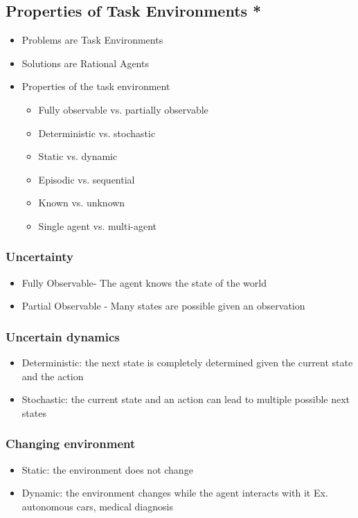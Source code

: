 \documentclass{article}
\begin{document}
\subsection{Properties of Task Environments  *}
\begin{itemize}
\item Problems are Task Environments
\item Solutions are Rational Agents
\item Properties of the task environment 
\begin{itemize}
\item Fully observable vs. partially observable
\item Deterministic vs. stochastic
\item Static vs. dynamic
\item Episodic vs. sequential
\item Known vs. unknown
\item Single agent vs. multi-agent
\end{itemize}
\end{itemize}

\subsubsection{Uncertainty}
\begin{itemize}
\item Fully Observable- The agent knows the state of the world
\item Partial Observable - Many states are possible given an observation 
\end{itemize}

\subsubsection{Uncertain dynamics}
\begin{itemize}
\item Deterministic: the next state is completely determined given the current state and the action
\item Stochastic: the current state and an action can lead to multiple possible next states
\end{itemize}

\subsubsection{Changing environment}
\begin{itemize}
\item Static: the environment does not change
\item Dynamic: the environment changes while the agent interacts with it
Ex. autonomous cars, medical diagnosis
\end{itemize}
\end{document}

